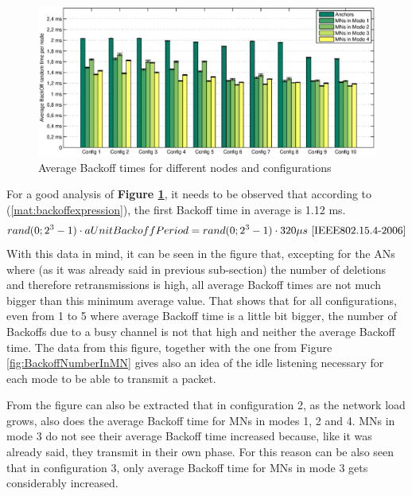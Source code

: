 \begin{figure}[ht]
 \begin{center}
  \includegraphics[width=1\textwidth]{averageBackoffTimeANandMN.eps}
 \end{center}
 \caption{Average Backoff times for different nodes and configurations}
 \label{fig:averageBackoffTimeANandMN}
\end{figure}

For a good analysis of \textbf{Figure \ref{fig:averageBackoffTimeANandMN}}, it needs to be observed that according to (\ref{mat:backoffexpression}),
the first Backoff time in average is 1.12 ms.
\begin{equation}
  rand(0;  2^3-1)\cdot aUnitBackoffPeriod = rand(0; 2^3-1)\cdot 320\mu s\ \cite{IEEE802.15.4-2006}
  \label{mat:backoffexpression}
\end{equation}
With this data in mind, it can be seen in the figure that, excepting for the \acp{AN} where (as it was already said in previous sub-section) the 
number of deletions and therefore retransmissions is high, all average Backoff times are not much bigger than this minimum average value. That shows that for
all configurations, even from 1 to 5 where average Backoff time is a little bit bigger, the number of Backoffs due to a busy channel is not that high and 
neither the average Backoff time. The data from this figure, together with the one from Figure \ref{fig:BackoffNumberInMN} gives
also an idea of the idle listening necessary for each mode to be able to transmit a packet.

From the figure can also be extracted that in configuration 2, as the network load grows, also does the average Backoff time for \acp{MN} in modes 1, 2 
and 4. \acp{MN} in mode 3 do not see their average Backoff time increased because, like it was already said, they transmit in their own phase. For this
reason can be also seen that in configuration 3, only average Backoff time for \acp{MN} in mode 3 gets considerably increased.

